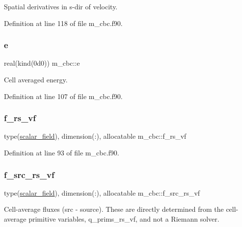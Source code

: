 Spatial derivatives in s-\/dir of velocity. 



Definition at line 118 of file m\+\_\+cbc.\+f90.

\mbox{\label{namespacem__cbc_a4e9565add4d8b423cbcecb0da55e232c}} 
\subsubsection{\texorpdfstring{e}{e}}
{\footnotesize\ttfamily real(kind(0d0)) m\+\_\+cbc\+::e}



Cell averaged energy. 



Definition at line 107 of file m\+\_\+cbc.\+f90.

\mbox{\label{namespacem__cbc_a9023ac4f88b32e7d88ca8fadb649b84f}} 
\subsubsection{\texorpdfstring{f\+\_\+rs\+\_\+vf}{f\_rs\_vf}}
{\footnotesize\ttfamily type(\hyperlink{structm__derived__types_1_1scalar__field}{scalar\+\_\+field}), dimension(\+:), allocatable m\+\_\+cbc\+::f\+\_\+rs\+\_\+vf}



Definition at line 93 of file m\+\_\+cbc.\+f90.

\mbox{\label{namespacem__cbc_ab079ec31add26b8d5f591b3cb5e5b88f}} 
\subsubsection{\texorpdfstring{f\+\_\+src\+\_\+rs\+\_\+vf}{f\_src\_rs\_vf}}
{\footnotesize\ttfamily type(\hyperlink{structm__derived__types_1_1scalar__field}{scalar\+\_\+field}), dimension(\+:), allocatable m\+\_\+cbc\+::f\+\_\+src\+\_\+rs\+\_\+vf}



Cell-\/average fluxes (src -\/ source). These are directly determined from the cell-\/average primitive variables, q\+\_\+prims\+\_\+rs\+\_\+vf, and not a Riemann solver. 




